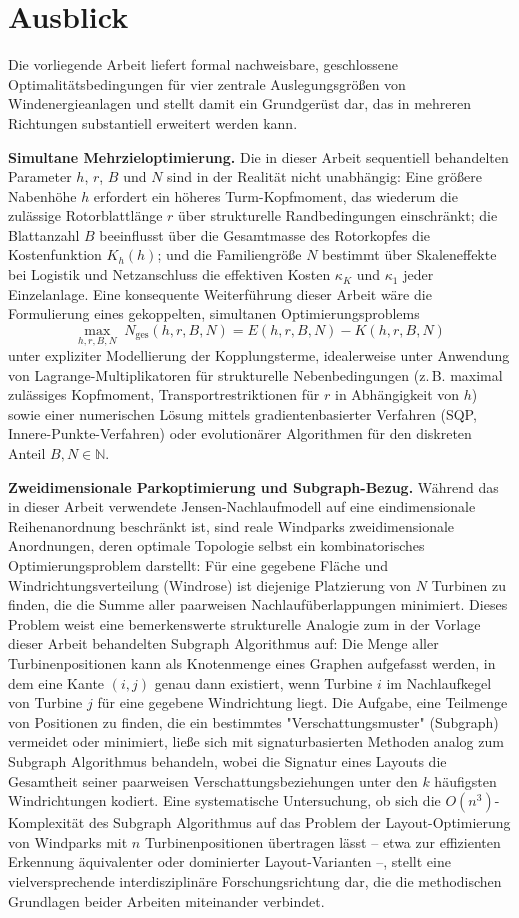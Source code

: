 ﻿\documentclass[a4paper,12pt]{article}
\theoremstyle{definition}
\begin{document}
\section{Ausblick}

Die vorliegende Arbeit liefert formal nachweisbare, geschlossene Optimalitätsbedingungen für vier zentrale Auslegungsgrößen von Windenergieanlagen und stellt damit ein Grundgerüst dar, das in mehreren Richtungen substantiell erweitert werden kann.

\textbf{Simultane Mehrzieloptimierung.} Die in dieser Arbeit sequentiell behandelten Parameter $h$, $r$, $B$ und $N$ sind in der Realität nicht unabhängig: Eine größere Nabenhöhe $h$ erfordert ein höheres Turm-Kopfmoment, das wiederum die zulässige Rotorblattlänge $r$ über strukturelle Randbedingungen einschränkt; die Blattanzahl $B$ beeinflusst über die Gesamtmasse des Rotorkopfes die Kostenfunktion $K_h(h)$; und die Familiengröße $N$ bestimmt über Skaleneffekte bei Logistik und Netzanschluss die effektiven Kosten $\kappa_K$ und $\kappa_1$ jeder Einzelanlage. Eine konsequente Weiterführung dieser Arbeit wäre die Formulierung eines gekoppelten, simultanen Optimierungsproblems
\[
\max_{h,r,B,N} \; N_{\mathrm{ges}}(h,r,B,N) = E(h,r,B,N) - K(h,r,B,N)
\]
unter expliziter Modellierung der Kopplungsterme, idealerweise unter Anwendung von Lagrange-Multiplikatoren für strukturelle Nebenbedingungen (z.\,B. maximal zulässiges Kopfmoment, Transportrestriktionen für $r$ in Abhängigkeit von $h$) sowie einer numerischen Lösung mittels gradientenbasierter Verfahren (SQP, Innere-Punkte-Verfahren) oder evolutionärer Algorithmen für den diskreten Anteil $B,N\in\mathbb{N}$.

\textbf{Zweidimensionale Parkoptimierung und Subgraph-Bezug.} Während das in dieser Arbeit verwendete Jensen-Nachlaufmodell auf eine eindimensionale Reihenanordnung beschränkt ist, sind reale Windparks zweidimensionale Anordnungen, deren optimale Topologie selbst ein kombinatorisches Optimierungsproblem darstellt: Für eine gegebene Fläche und Windrichtungsverteilung (Windrose) ist diejenige Platzierung von $N$ Turbinen zu finden, die die Summe aller paarweisen Nachlaufüberlappungen minimiert. Dieses Problem weist eine bemerkenswerte strukturelle Analogie zum in der Vorlage dieser Arbeit behandelten Subgraph Algorithmus auf: Die Menge aller Turbinenpositionen kann als Knotenmenge eines Graphen aufgefasst werden, in dem eine Kante $(i,j)$ genau dann existiert, wenn Turbine $i$ im Nachlaufkegel von Turbine $j$ für eine gegebene Windrichtung liegt. Die Aufgabe, eine Teilmenge von Positionen zu finden, die ein bestimmtes "Verschattungsmuster" (Subgraph) vermeidet oder minimiert, ließe sich mit signaturbasierten Methoden analog zum Subgraph Algorithmus behandeln, wobei die Signatur eines Layouts die Gesamtheit seiner paarweisen Verschattungsbeziehungen unter den $k$ häufigsten Windrichtungen kodiert. Eine systematische Untersuchung, ob sich die $O(n^3)$-Komplexität des Subgraph Algorithmus auf das Problem der Layout-Optimierung von Windparks mit $n$ Turbinenpositionen übertragen lässt -- etwa zur effizienten Erkennung äquivalenter oder dominierter Layout-Varianten --, stellt eine vielversprechende interdisziplinäre Forschungsrichtung dar, die die methodischen Grundlagen beider Arbeiten miteinander verbindet.
\end{document}
